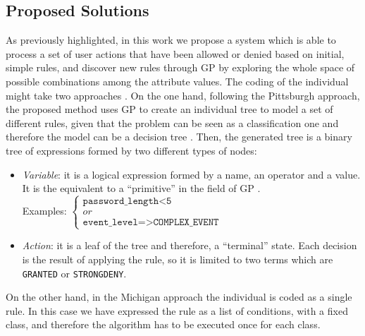 \documentclass[a4paper,10pt,twocolumn,preprint,3p]{elsarticle}
\begin{document}
\subsection{Proposed Solutions}
\label{subsec:solution}

As previously highlighted, in this work we propose a system which is
able to process a set of user actions that have been allowed or denied
based on initial, simple rules, and discover new rules through GP by exploring
the whole space of possible combinations among the attribute
values. The coding of the individual might take two approaches \cite{freitas2002data}. On the one hand, following the Pittsburgh approach, the proposed method uses GP to create an individual tree to model a set of different rules, given that the problem can be seen as a
classification one and therefore the model can be a decision tree
\cite{safavian1990survey}. Then, the generated tree is a binary tree
of expressions formed by two different types of nodes:

\begin{itemize}
\item {\em Variable}: it is a logical expression formed by a name, an operator and a value. It is the equivalent to a ``primitive'' in the field of GP \cite{back1996evolutionary}.  \\
    Examples:
   \begin{math}
     \left \{
   \begin{array}{l}
     \texttt{password\_length<5} \\
     or \\
      \texttt{event\_level=>COMPLEX\_EVENT}
   \end{array}
   \right .
   \end{math}
\item {\em Action}: it is a leaf of the tree and therefore, a ``terminal'' state. Each decision is the result of applying the rule, so it is limited to two terms which are \texttt{GRANTED} or \texttt{STRONGDENY}.
\end{itemize}

On the other hand, in the Michigan approach the individual is coded as a single rule. In this case we have expressed the rule as a list of conditions, with a fixed class, and therefore the algorithm has to be executed once for each class.
\end{document}
